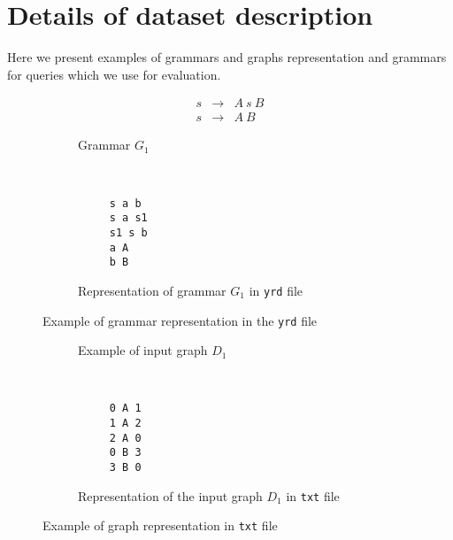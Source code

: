 \section{Details of dataset description}

Here we present examples of grammars and graphs representation and grammars for queries which we use for evaluation.

\begin{figure}[h]
    \centering
    \begin{subfigure}[b]{0.24\textwidth}
        \centering
        \[
         \begin{array}{rcl}
           s & \rightarrow & A \ s \ B \\
           s & \rightarrow & A \ B
         \end{array}
         \]
        \caption{Grammar $G_1$}
    \end{subfigure}%
    ~
    \begin{subfigure}[b]{0.24\textwidth}
        \centering
        \begin{verbatim}
     s a b
     s a s1
     s1 s b
     a A
     b B
        \end{verbatim}
        \caption{Representation of grammar $G_1$ in \texttt{yrd} file}
    \end{subfigure}
    \caption{Example of grammar representation in the \texttt{yrd} file}
    \label{fig:grammar_example}
\end{figure}


\begin{figure}[h]
    \centering
    \begin{subfigure}[b]{0.24\textwidth}
        \centering

        \caption{Example of input graph $D_1$}
    \end{subfigure}%
    ~
    \begin{subfigure}[b]{0.24\textwidth}
        \centering
         \begin{verbatim}
     0 A 1
     1 A 2
     2 A 0
     0 B 3
     3 B 0
 \end{verbatim}

        \caption{Representation of the input graph $D_1$ in \texttt{txt} file}
    \end{subfigure}
    \caption{Example of graph representation in \texttt{txt} file}
    \label{fig:graph_example}
\end{figure}


